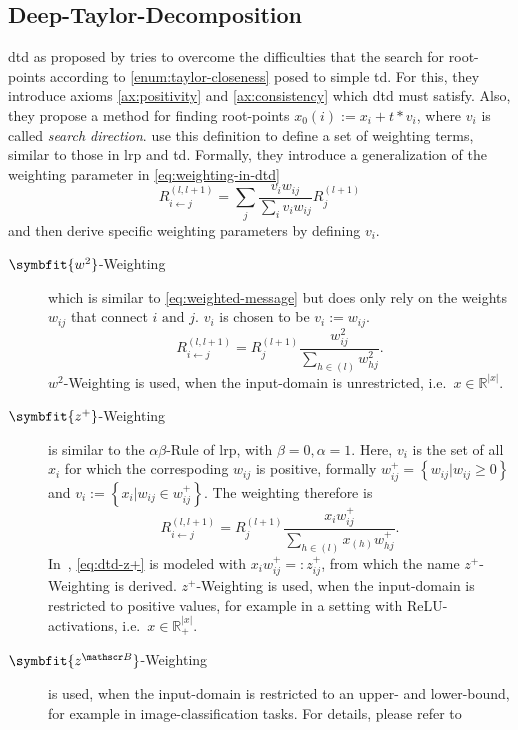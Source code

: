 \subsection{Deep-Taylor-Decomposition}
\gls{dtd} as proposed by  tries to overcome the difficulties that the search for root-points according to \cref{enum:taylor-closeness} posed to simple \gls{td}. For this, they introduce axioms \ref{ax:positivity} and \ref{ax:consistency} which \gls{dtd} must satisfy. Also, they propose a method for finding root-points \(x_0(i):= x_i + t*v_i\), where \(v_i\) is called \textit{search direction}. \citeauthor{Montavon.2017} use this definition to define a set of weighting terms, similar to those in \gls{lrp} and \gls{td}. Formally, they introduce a generalization of the weighting parameter in \cref{eq:weighting-in-dtd}\cite[see][Supplementary Material]{Montavon.2017}
\begin{equation}
    R_{i\leftarrow j}^{(l,l+1)} = \sum_j \frac{v_i w_{ij}}{\sum_i v_i w_{ij}} R_j^{(l+1)}\label{eq:weighting-in-dtd}
\end{equation}
and then derive specific weighting parameters by defining \(v_i\).
\begin{description}
    \item[\(\symbfit{w^2}\)-Weighting] which is similar to \cref{eq:weighted-message} but does only rely on the weights \(w_{ij}\) that connect \(i \text{ and } j\). \(v_i\) is chosen to be \(v_i:=w_{ij}\).
    \begin{equation}
        R_{i\leftarrow j}^{(l,l+1)} = R_{j}^{(l+1)} \frac{w_{ij}^2}{\sum_{h\in (l)} w_{hj}^2}.\label{eq:w2-weighting-dtd}
    \end{equation}
    \(w^2\)-Weighting is used, when the input-domain is unrestricted, i.e.\ \(x\in \mathbb R^{|x|}\).
    \item[\(\symbfit{z^+}\)-Weighting] is similar to the \(\alpha \beta\)-Rule of \gls{lrp}, with \(\beta=0, \alpha=1\). Here, \(v_i\) is the set of all \(x_i\) for which the correspoding \(w_{ij}\) is positive, formally \(w_{ij}^{+} = \left\{w_{ij} | w_{ij}\geq 0\right\}\) and \(v_i:=\left\{x_i|w_{ij}\in w_{ij}^{+}\right\}\). The weighting therefore is
    \begin{equation}
        R_{i\leftarrow j}^{(l,l+1)} = R_{j}^{(l+1)} \frac{x_i w_{ij}^{+}}{\sum_{h\in (l)} x_(h) w_{hj}^{+}}.\label{eq:dtd-z+}
    \end{equation}
    In~\cite{Montavon.2017}, \cref{eq:dtd-z+} is modeled with \(x_i w_{ij}^{+}=:z_{ij}^{+}\), from which the name \(z^{+}\)-Weighting is derived.
    \(z^{+}\)-Weighting is used, when the input-domain is restricted to positive values, for example in a setting with ReLU-activations, i.e.\ \(x\in \mathbb R_{+}^{|x|}\).
    \item[\(\symbfit{z^{\mathscr B}}\)-Weighting] is used, when the input-domain is restricted to an upper- and lower-bound, for example in image-classification tasks. For details, please refer to~\cite[215\psq]{Montavon.2017}
\end{description}

